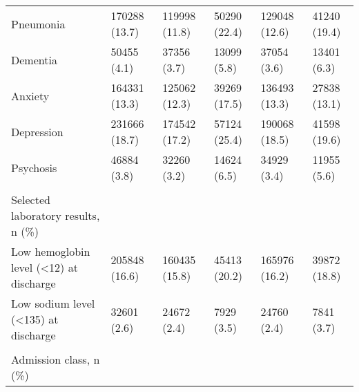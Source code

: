 \begin{adjustbox}{width={\textwidth},totalheight={\textheight},keepaspectratio,frame}
{\begin{tabular}{L{20em}C{10em}C{10em}C{10em}C{10em}C{10em}}
\hspace{3mm}                             Pneumonia &      170288 (13.7) &                 119998 (11.8) &              50290 (22.4) &                  129048 (12.6) &              41240 (19.4) \\
\hspace{3mm}                              Dementia &        50455 (4.1) &                   37356 (3.7) &               13099 (5.8) &                    37054 (3.6) &               13401 (6.3) \\
\hspace{3mm}                               Anxiety &      164331 (13.3) &                 125062 (12.3) &              39269 (17.5) &                  136493 (13.3) &              27838 (13.1) \\
\hspace{3mm}                            Depression &      231666 (18.7) &                 174542 (17.2) &              57124 (25.4) &                  190068 (18.5) &              41598 (19.6) \\
\hspace{3mm}                             Psychosis &        46884 (3.8) &                   32260 (3.2) &               14624 (6.5) &                    34929 (3.4) &               11955 (5.6) \\
&                 &                            &                        &                             &                        \\
Selected laboratory results, n (\%) &                 &                            &                        &                             &                        \\
\hspace{3mm}   Low hemoglobin level (<12) at discharge &      205848 (16.6) &                 160435 (15.8) &              45413 (20.2) &                  165976 (16.2) &              39872 (18.8) \\
\hspace{3mm}   Low sodium level (<135) at discharge &        32601 (2.6) &                   24672 (2.4) &                7929 (3.5) &                    24760 (2.4) &                7841 (3.7) \\
&                 &                            &                        &                             &                        \\
Admission class, n (\%) &                 &                            &                        &                             &                        \\

\end{tabular}}
\end{adjustbox}
